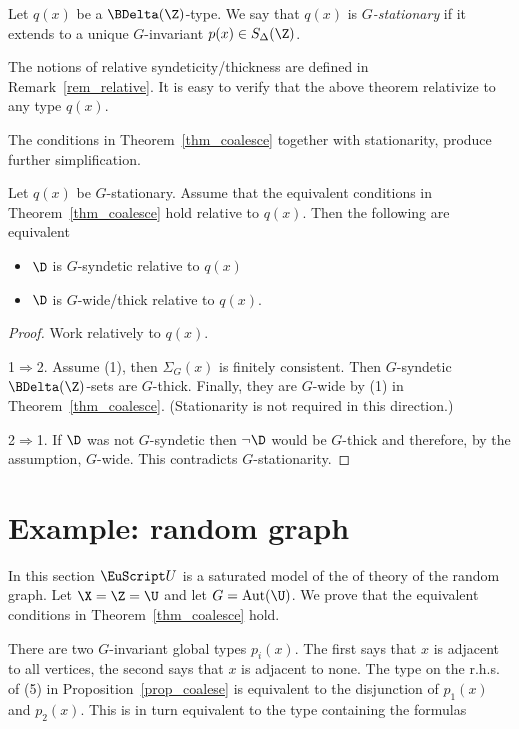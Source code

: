 Let $q(x)$ be a $\BDelta(\Z)$-type.
We say that $q(x)$ is \emph{$G$-stationary\/} if it extends to a unique $G$-in\-var\-iant $p(x)\in S_\Delta(\Z)$.

The notions of relative syndeticity/thickness are defined in Remark~\ref{rem_relative}.
It is easy to verify that the above theorem relativize to any type $q(x)$.

The conditions in Theorem~\ref{thm_coalesce} together with stationarity, produce further simplification.

\begin{fact}\label{fact_stationarity}
  Let $q(x)$ be $G$-stationary.
  Assume that the equivalent conditions in Theorem~\ref{thm_coalesce} hold relative to $q(x)$.
  Then the following are equivalent
  \begin{itemize}
    \item [1.] $\D$ is $G$-syndetic relative to $q(x)$
    \item [2.] $\D$ is $G$-wide/thick relative to $q(x)$.
  \end{itemize}
\end{fact}

\begin{proof}
  Work relatively to $q(x)$.

  1$\Rightarrow$2.
  Assume (1), then $\Sigma_G(x)$ is finitely consistent.
  Then $G$-syndetic $\BDelta({\Z})$-sets are $G$-thick.
  Finally, they are $G$-wide by (1) in Theorem~\ref{thm_coalesce}.
  (Stationarity is not required in this direction.)

  2$\Rightarrow$1.
  If $\D$ was not $G$-syndetic then $\neg\D$ would be $G$-thick and therefore, by the assumption, $G$-wide.
  This contradicts $G$-stationarity.
\end{proof}

\section{Example: random graph}

In this section $\EuScript U$ is a saturated model of the of theory of the random graph.
Let $\X=\Z=\U$ and let $G={\rm Aut}(\U)$.
We prove that the equivalent conditions in Theorem~\ref{thm_coalesce} hold.

There are two $G$-invariant global types $p_i(x)$.
The first says that $x$ is adjacent to all vertices, the second says that $x$ is adjacent to none.
The type on the r.h.s. of (5) in Proposition~\ref{prop_coalese} is equivalent to the disjunction of $p_1(x)$ and $p_2(x)$.
This is in turn equivalent to the type containing the formulas

